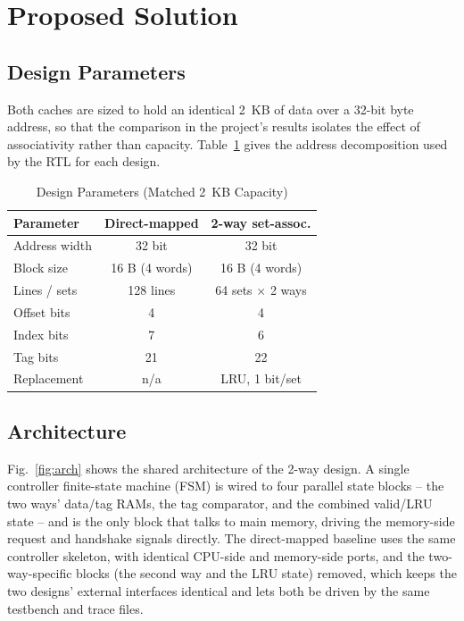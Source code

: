 \documentclass[conference]{IEEEtran}
\begin{document}
\section{Proposed Solution}
\subsection{Design Parameters}
Both caches are sized to hold an identical 2~KB of data over a 32-bit byte address, so that the comparison in the project's results isolates the effect of associativity rather than capacity. Table~\ref{tab:params} gives the address decomposition used by the RTL for each design.

\begin{table}[h]
\centering
\caption{Design Parameters (Matched 2~KB Capacity)}
\label{tab:params}
\begin{tabular}{@{}lcc@{}}
\toprule
\textbf{Parameter} & \textbf{Direct-mapped} & \textbf{2-way set-assoc.} \\
\midrule
Address width & 32 bit & 32 bit \\
Block size & 16 B (4 words) & 16 B (4 words) \\
Lines / sets & 128 lines & 64 sets $\times$ 2 ways \\
Offset bits & 4 & 4 \\
Index bits & 7 & 6 \\
Tag bits & 21 & 22 \\
Replacement & n/a & LRU, 1 bit/set \\
\bottomrule
\end{tabular}
\end{table}

\subsection{Architecture}
Fig.~\ref{fig:arch} shows the shared architecture of the 2-way design. A single controller finite-state machine (FSM) is wired to four parallel state blocks -- the two ways' data/tag RAMs, the tag comparator, and the combined valid/LRU state -- and is the only block that talks to main memory, driving the memory-side request and handshake signals directly. The direct-mapped baseline uses the same controller skeleton, with identical CPU-side and memory-side ports, and the two-way-specific blocks (the second way and the LRU state) removed, which keeps the two designs' external interfaces identical and lets both be driven by the same testbench and trace files.
\end{document}
